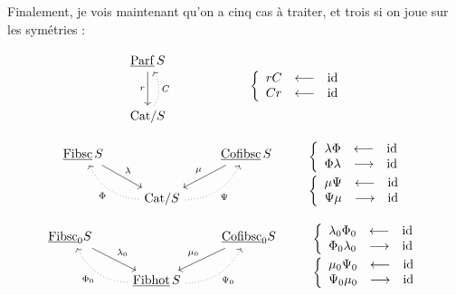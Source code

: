 \documentclass[11pt]{article}
\newcommand{\msp}[1]{\marginpar{\footnotesize [#1]}}
\newcommand{\ul}[1]{\underline{\mathrm{#1}}}
\begin{document}
Finalement, je vois maintenant qu'on a cinq cas à traiter, et trois si on joue sur les symétries :

\msp{page 57}

\[
\begin{tikzcd}[row sep=large]
\ul{Parf}\,S \arrow[d, "r"'] \\
\mathrm{Cat}/S \arrow[u, dotted, bend right, "C"']
\end{tikzcd}
\qquad\qquad\qquad
\left\{\begin{array}{lcl}
rC & \longleftarrow & \mathrm{id} \\
Cr & \longleftarrow & \mathrm{id}
\end{array}\right.
\]

\[
\begin{tikzcd}
\ul{Fibsc}\,S \arrow[dr, "\lambda"] & & \ul{Cofibsc}\,S \arrow[dl, "\mu"'] \\
& \mathrm{Cat}/S \arrow[ul, dotted, bend left, "\Phi"] \arrow[ur, dotted, bend right, "\Psi"'] &
\end{tikzcd}
\qquad
\begin{array}{l}
\left\{\begin{array}{lcl}
\lambda\Phi & \longleftarrow & \mathrm{id} \\
\Phi\lambda & \longrightarrow & \mathrm{id}
\end{array}\right. \\[2ex]
\left\{\begin{array}{lcl}
\mu\Psi & \longleftarrow & \mathrm{id} \\
\Psi\mu & \longrightarrow & \mathrm{id}
\end{array}\right.
\end{array}
\]

\[
\begin{tikzcd}
\underline{\mathrm{Fibsc}}_0 S \arrow[dr, "\lambda_0"] & & \underline{\mathrm{Cofibsc}}_0 S \arrow[dl, "\mu_0"'] \\
& \ul{Fibhot}\,S \arrow[ul, dotted, bend left, "\Phi_0"] \arrow[ur, dotted, bend right, "\Psi_0"'] &
\end{tikzcd}
\qquad
\begin{array}{l}
\left\{\begin{array}{lcl}
\lambda_0\Phi_0 & \longleftarrow & \mathrm{id} \\
\Phi_0\lambda_0 & \longrightarrow & \mathrm{id}
\end{array}\right. \\[2ex]
\left\{\begin{array}{lcl}
\mu_0\Psi_0 & \longleftarrow & \mathrm{id} \\
\Psi_0\mu_0 & \longrightarrow & \mathrm{id}
\end{array}\right.
\end{array}
\]
\end{document}
